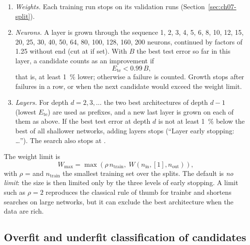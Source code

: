 \begin{enumerate}
  \item \emph{Weights.} Each training run stops on its validation runs (Section~\ref{sec:ch07-split}).
  \item \emph{Neurons.} A layer is grown through the sequence 1, 2, 3, 4, 5, 6, 8, 10, 12, 15, 20, 25, 30, 40,
    50, 64, 80, 100, 128, 160, 200 neurons, continued by factors of 1.25 without end (cut at  if set). With $B$ the best test error so far in this layer, a candidate counts as an improvement
    if
    \begin{equation}
      E_\text{te} < 0.99\,B, \label{eq:ch07-grow}
    \end{equation}
    that is, at least 1~\% lower; otherwise a failure is counted. Growth stops after 
    failures in a row, or when the next candidate would exceed the weight limit.
  \item \emph{Layers.} For depth $d = 2, 3, \dots$ the two best architectures of depth $d-1$ (lowest $E_\text{te}$)
    are used as prefixes, and a new last layer is grown on each of them as above. If the best test error at depth
    $d$ is not at least 1~\% below the best of all shallower networks, adding layers stops (``Layer early stopping:
    \dots''). The search also stops at .
\end{enumerate}
The weight limit is
\begin{equation}
  W_\text{max} = \max\!\left(\rho\, n_\text{train},\; W(n_\text{in},[1],n_\text{out})\right), \label{eq:ch07-wlimit}
\end{equation}
with $\rho$ =  and $n_\text{train}$ the smallest training set over the
splits. The default is \emph{no limit}: the size is then limited only by the three levels of early stopping. A
limit such as $\rho = 2$ reproduces the classical rule of thumb for trainbr and shortens searches on large
networks, but it can exclude the best architecture when the data are rich.

\subsection{Overfit and underfit classification of candidates}

